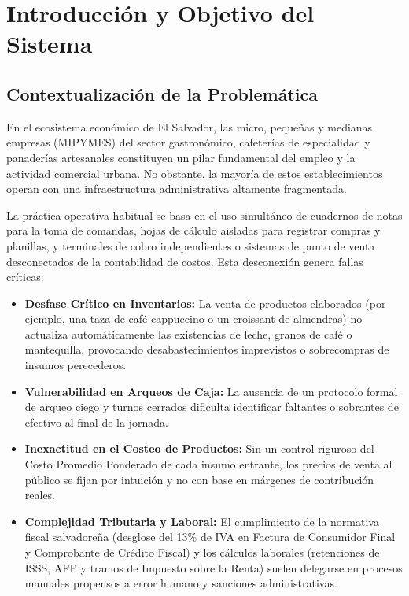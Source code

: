 \section{Introducción y Objetivo del Sistema}
\label{sec:introduccion_objetivos}

\subsection{Contextualización de la Problemática}
En el ecosistema económico de El Salvador, las micro, pequeñas y medianas empresas (MIPYMES) del sector gastronómico, cafeterías de especialidad y panaderías artesanales constituyen un pilar fundamental del empleo y la actividad comercial urbana. No obstante, la mayoría de estos establecimientos operan con una infraestructura administrativa altamente fragmentada.

La práctica operativa habitual se basa en el uso simultáneo de cuadernos de notas para la toma de comandas, hojas de cálculo aisladas para registrar compras y planillas, y terminales de cobro independientes o sistemas de punto de venta desconectados de la contabilidad de costos. Esta desconexión genera fallas críticas:
\begin{itemize}
    \item \textbf{Desfase Crítico en Inventarios:} La venta de productos elaborados (por ejemplo, una taza de café cappuccino o un croissant de almendras) no actualiza automáticamente las existencias de leche, granos de café o mantequilla, provocando desabastecimientos imprevistos o sobrecompras de insumos perecederos.
    \item \textbf{Vulnerabilidad en Arqueos de Caja:} La ausencia de un protocolo formal de arqueo ciego y turnos cerrados dificulta identificar faltantes o sobrantes de efectivo al final de la jornada.
    \item \textbf{Inexactitud en el Costeo de Productos:} Sin un control riguroso del Costo Promedio Ponderado de cada insumo entrante, los precios de venta al público se fijan por intuición y no con base en márgenes de contribución reales.
    \item \textbf{Complejidad Tributaria y Laboral:} El cumplimiento de la normativa fiscal salvadoreña (desglose del 13\% de IVA en Factura de Consumidor Final y Comprobante de Crédito Fiscal) y los cálculos laborales (retenciones de ISSS, AFP y tramos de Impuesto sobre la Renta) suelen delegarse en procesos manuales propensos a error humano y sanciones administrativas.
\end{itemize}

